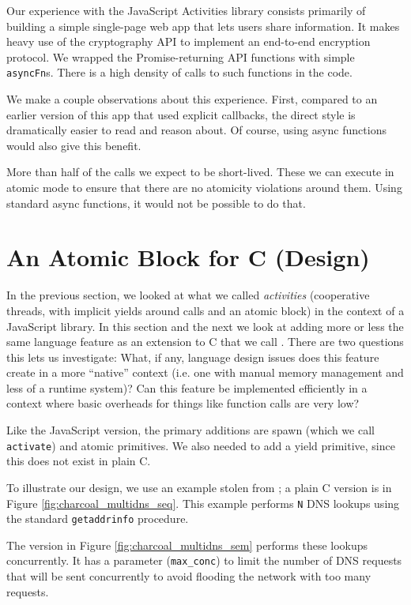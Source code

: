 \documentclass[acmsmall,anonymous,review]{acmart}\settopmatter{printfolios=true,printccs=false,printacmref=false}
\begin{document}
Our experience with the JavaScript Activities library consists primarily of building a simple single-page web app that lets users share information.
It makes heavy use of the cryptography API to implement an end-to-end encryption protocol.
We wrapped the Promise-returning API functions with simple \texttt{asyncFn}s.
There is a high density of calls to such functions in the code.

We make a couple observations about this experience.
First, compared to an earlier version of this app that used explicit callbacks, the direct style is dramatically easier to read and reason about.
Of course, using async functions would also give this benefit.

More than half of the calls we expect to be short-lived.
These we can execute in atomic mode to ensure that there are no atomicity violations around them.
Using standard async functions, it would not be possible to do that.

\section{An Atomic Block for C (Design)}

In the previous section, we looked at what we called \emph{activities} (cooperative threads, with implicit yields around calls and an atomic block) in the context of a JavaScript library.
In this section and the next we look at adding more or less the same language feature as an extension to C that we call \charcoal{}.
There are two questions this lets us investigate:
What, if any, language design issues does this feature create in a more ``native'' context (i.e. one with manual memory management and less of a runtime system)?
Can this feature be implemented efficiently in a context where basic overheads for things like function calls are very low?

Like the JavaScript version, the primary additions are spawn (which we call \texttt{activate}) and atomic primitives.
We also needed to add a yield primitive, since this does not exist in plain C.

To illustrate our design, we use an example stolen from \cite{Krohn2007}; a plain C version is in Figure \ref{fig:charcoal_multidns_seq}.
This example performs \texttt{N} DNS lookups using the standard \texttt{getaddrinfo} procedure.

The \charcoal{} version in Figure \ref{fig:charcoal_multidns_sem} performs these lookups concurrently.
It has a parameter (\texttt{max\_conc}) to limit the number of DNS requests that will be sent concurrently to avoid flooding the network with too many requests.
\end{document}
